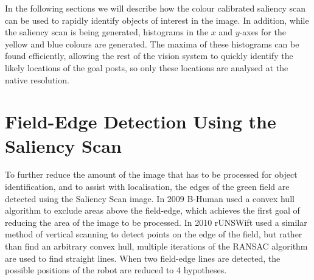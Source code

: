 \documentclass[runningheads,a4paper]{llncs}
\begin{document}
In the following sections we will describe how the colour calibrated saliency scan can be used to rapidly identify objects of interest in the image. In addition, while the saliency scan is being generated, histograms in the $x$ and $y$-axes for the yellow and blue colours are generated. The maxima of these histograms can be found efficiently, allowing the rest of the vision system to quickly identify the likely locations of the goal posts, so only these locations are analysed at the native resolution.


\section{Field-Edge Detection Using the Saliency Scan}

To further reduce the amount of the image that has to be processed for object
identification, and to assist with localisation, the edges of the green field
are detected using the Saliency Scan image. In 2009 B-Human used a convex hull
algorithm to exclude areas above the field-edge\cite{thomas09code}, which
achieves the first goal of reducing the area of the image to be processed. In
2010 rUNSWift used a similar method of vertical scanning to detect points on the
edge of the field, but rather than find an arbitrary convex hull, multiple
iterations of the RANSAC algorithm\cite{Fischler:1981:RSC:358669.358692} are
used to find straight lines. When two field-edge lines are detected, the
possible positions of the robot are reduced to 4 hypotheses.
\end{document}

